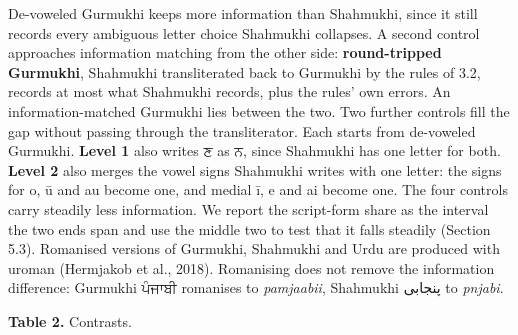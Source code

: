 De-voweled Gurmukhi keeps more information than Shahmukhi, since it
still records every ambiguous letter choice Shahmukhi collapses. A
second control approaches information matching from the other side:
\textbf{round-tripped Gurmukhi}, Shahmukhi transliterated back to
Gurmukhi by the rules of 3.2, records at most what Shahmukhi records,
plus the rules' own errors. An information-matched Gurmukhi lies between
the two. Two further controls fill the gap without passing through the
transliterator. Each starts from de-voweled Gurmukhi. \textbf{Level 1}
also writes {\gurfont ਣ} as {\gurfont ਨ}, since Shahmukhi has one letter for both.
\textbf{Level 2} also merges the vowel signs Shahmukhi writes with one
letter: the signs for o, ū and au become one, and medial ī, e and ai
become one. The four controls carry steadily less information. We report
the script-form share as the interval the two ends span and use the
middle two to test that it falls steadily (Section 5.3). Romanised
versions of Gurmukhi, Shahmukhi and Urdu are produced with uroman
(Hermjakob et al., 2018). Romanising does not remove the information
difference: Gurmukhi {\gurfont ਪੰਜਾਬੀ} romanises to \emph{pamjaabii}, Shahmukhi
{\arabfont\beginR پنجابی\endR} to \emph{pnjabi}.

\textbf{Table 2.} Contrasts.


